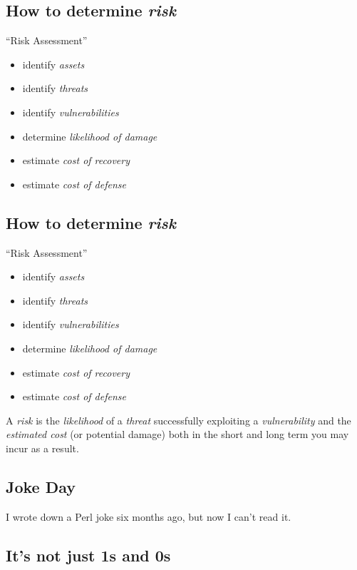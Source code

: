 \documentclass[xga]{xdvislides}
\begin{document}
\subsection{How to determine {\em risk}}
``Risk Assessment''
\begin{itemize}
	\item identify {\em assets}
	\item identify {\em threats}
	\item identify {\em vulnerabilities}
	\item determine {\em likelihood of damage}
	\item estimate {\em cost of recovery}
	\item estimate {\em cost of defense}
\end{itemize}

\subsection{How to determine {\em risk}}
``Risk Assessment''
\begin{itemize}
	\item identify {\em assets}
	\item identify {\em threats}
	\item identify {\em vulnerabilities}
	\item determine {\em likelihood of damage}
	\item estimate {\em cost of recovery}
	\item estimate {\em cost of defense}
\end{itemize}
\vspace{.5in}

A {\em risk} is the {\em likelihood} of a {\em threat} successfully exploiting
a {\em vulnerability} and the {\em estimated cost} (or potential damage) both
in the short and long term you may incur as a result.

\subsection{Joke Day}
\vspace*{\fill}
\begin{center}
\Huge
I wrote down a Perl joke six months ago, but now I can’t read it.
\Normalsize
\end{center}
\vspace*{\fill}

\subsection{It's not just 1s and 0s}
\vspace{.5in}
\end{document}
